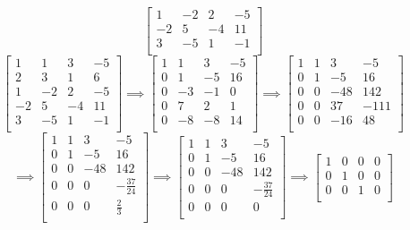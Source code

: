 \documentclass{article}
\begin{document}
\begin{enumerate}[1.]
$$\begin{bmatrix}
1  & -2 & 2  & -5 \\
-2 & 5  & -4 & 11 \\
3  & -5 & 1  & -1 \\
\end{bmatrix}
$$
$$
\begin{bmatrix}
1  & 1  & 3  & -5 \\
2  & 3  & 1  & 6  \\
1  & -2 & 2  & -5 \\
-2 & 5  & -4 & 11 \\
3  & -5 & 1  & -1 \\
\end{bmatrix}
\implies
\begin{bmatrix}
1  & 1  & 3  & -5 \\
0  & 1  & -5 & 16 \\
0  & -3 & -1 & 0  \\
0  & 7  & 2  & 1  \\
0  & -8 & -8 & 14 \\
\end{bmatrix}
\implies
\begin{bmatrix}
1  & 1  & 3  & -5 \\
0  & 1  & -5 & 16 \\
0  & 0  &-48 & 142\\
0  & 0  & 37 &-111\\
0  & 0  & -16& 48 \\
\end{bmatrix}
$$
$$
\implies
\begin{bmatrix}
1  & 1  & 3  & -5 \\
0  & 1  & -5 & 16 \\
0  & 0  &-48 & 142\\
0  & 0  & 0  &-\frac{37}{24}\\
0  & 0  & 0  &\frac{2}{3}\\
\end{bmatrix}
\implies
\begin{bmatrix}
1  & 1  & 3  & -5 \\
0  & 1  & -5 & 16 \\
0  & 0  &-48 & 142\\
0  & 0  & 0  &-\frac{37}{24}\\
0  & 0  & 0  & 0\\
\end{bmatrix}
\implies
\begin{bmatrix}
1  & 0  & 0  & 0 \\
0  & 1  & 0  & 0 \\
0  & 0  & 1  & 0 \\

\end{bmatrix}$$
\end{enumerate}
\end{document}
